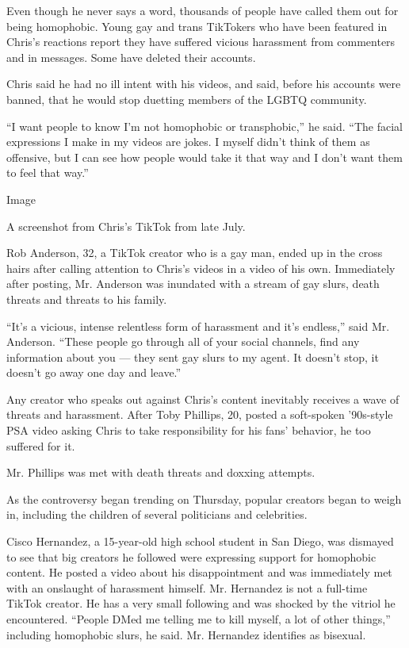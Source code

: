 Even though he never says a word, thousands of people have called them
out for being homophobic. Young gay and trans TikTokers who have been
featured in Chris's reactions report they have suffered vicious
harassment from commenters and in messages. Some have deleted their
accounts.

Chris said he had no ill intent with his videos, and said, before his
accounts were banned, that he would stop duetting members of the LGBTQ
community.

``I want people to know I'm not homophobic or transphobic,'' he said.
``The facial expressions I make in my videos are jokes. I myself didn't
think of them as offensive, but I can see how people would take it that
way and I don't want them to feel that way.''

Image

A screenshot from Chris's TikTok from late July.

Rob Anderson, 32, a TikTok creator who is a gay man, ended up in the
cross hairs after calling attention to Chris's videos in a video of his
own. Immediately after posting, Mr. Anderson was inundated with a stream
of gay slurs, death threats and threats to his family.

``It's a vicious, intense relentless form of harassment and it's
endless,'' said Mr. Anderson. ``These people go through all of your
social channels, find any information about you --- they sent gay slurs
to my agent. It doesn't stop, it doesn't go away one day and leave.''

Any creator who speaks out against Chris's content inevitably receives a
wave of threats and harassment. After Toby Phillips, 20, posted a
soft-spoken '90s-style PSA video asking Chris to take responsibility for
his fans' behavior, he too suffered for it.

Mr. Phillips was met with death threats and doxxing attempts.

As the controversy began trending on Thursday, popular creators began to
weigh in, including the children of several politicians and celebrities.

Cisco Hernandez, a 15-year-old high school student in San Diego, was
dismayed to see that big creators he followed were expressing support
for homophobic content. He posted a video about his disappointment and
was immediately met with an onslaught of harassment himself. Mr.
Hernandez is not a full-time TikTok creator. He has a very small
following and was shocked by the vitriol he encountered. ``People DMed
me telling me to kill myself, a lot of other things,'' including
homophobic slurs, he said. Mr. Hernandez identifies as bisexual.

